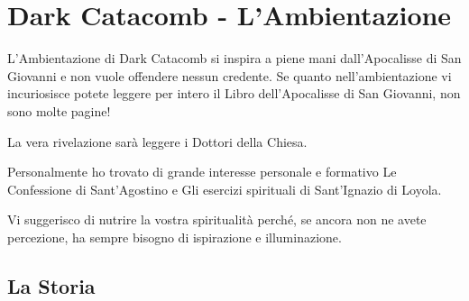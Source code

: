 \documentclass[12pt,a4paper,twoside,openany]{book}
\begin{document}
\pagebreak

\section{Dark Catacomb - L'Ambientazione}



\begin{narratore}
L'Ambientazione di Dark Catacomb si inspira a piene mani dall'Apocalisse di San Giovanni e non vuole offendere nessun credente. Se quanto nell'ambientazione vi incuriosisce potete leggere per intero il Libro dell'Apocalisse di San Giovanni, non sono molte pagine!
	
La  vera rivelazione sarà leggere i Dottori della Chiesa.
	
Personalmente ho trovato di grande interesse personale e formativo Le Confessione di Sant'Agostino e Gli esercizi spirituali di Sant'Ignazio di Loyola.
	
Vi suggerisco di nutrire la vostra spiritualità perché, se ancora non ne avete percezione, ha sempre bisogno di ispirazione e illuminazione.
	
\end{narratore}	

\subsection{La Storia}
\end{document}
